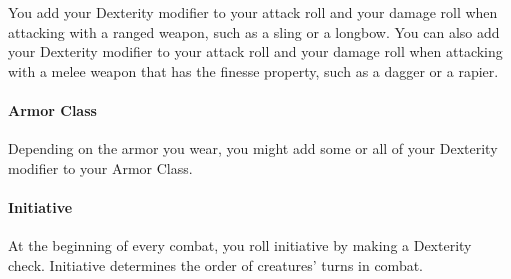 \documentclass[
]{article}
\begin{document}
You add your Dexterity modifier to your attack roll and your damage roll
when attacking with a ranged weapon, such as a sling or a longbow. You
can also add your Dexterity modifier to your attack roll and your damage
roll when attacking with a melee weapon that has the finesse property,
such as a dagger or a rapier.

\hypertarget{armor-class}{%
\paragraph{Armor Class}\label{armor-class}}

Depending on the armor you wear, you might add some or all of your
Dexterity modifier to your Armor Class.

\hypertarget{initiative}{%
\paragraph{Initiative}\label{initiative}}

At the beginning of every combat, you roll initiative by making a
Dexterity check. Initiative determines the order of creatures' turns in
combat.
\end{document}
